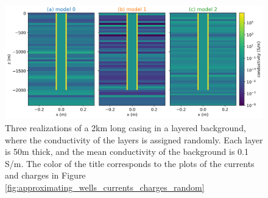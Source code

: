 \begin{figure}
    \begin{center}
    \includegraphics[width=\textwidth]{figures/random_layers.png}
    \end{center}
\caption{
    Three realizations of a 2km long casing in a layered background, where the conductivity of the
    layers is assigned randomly. Each layer is 50m thick, and the mean conductivity of the background
    is 0.1 S/m. The color of the title corresponds to the plots of the currents and charges in Figure
    \ref{fig:approximating_wells_currents_charges_random}
}
\label{fig:random_layers}
\end{figure}
